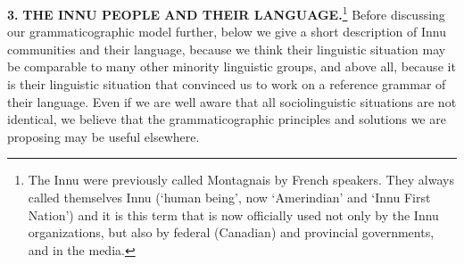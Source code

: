 \documentclass[letterpaper]{article}
\begin{document}
\textbf{3.}\textbf{ }\textbf{THE INNU PEOPLE AND THEIR LANGUAGE}\textbf{.}\footnote{ The Innu were previously called Montagnais by French speakers. They always called themselves Innu ({\textquoteleft}human being{\textquoteright}, now {\textquoteleft}Amerindian{\textquoteright} and {\textquoteleft}Innu First Nation{\textquoteright}) and it is this term that is now officially used not only by the Innu organizations, but also by federal (Canadian) and provincial governments, and in the media.} Before discussing our grammati\-cographic model further, below we give a short description of Innu communities and their language, because we think their linguistic situation may be comparable to many other minority linguistic groups, and above all, because it is their linguistic situation that convinced us to work on a reference grammar of their language. Even if we are well aware that all sociolinguistic situations are not identical, we believe that the grammaticographic principles and solutions we are proposing may be useful elsewhere. 
\end{document}
